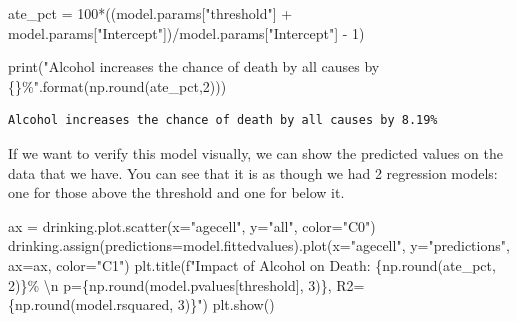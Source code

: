 \documentclass[
  letterpaper,
  DIV=11,
  numbers=noendperiod]{scrreprt}
\newenvironment{Shaded}{\begin{snugshade}}{\end{snugshade}}
\newcommand{\BuiltInTok}[1]{\textcolor[rgb]{0.00,0.23,0.31}{#1}}
\newcommand{\CharTok}[1]{\textcolor[rgb]{0.13,0.47,0.30}{#1}}
\newcommand{\DecValTok}[1]{\textcolor[rgb]{0.68,0.00,0.00}{#1}}
\newcommand{\NormalTok}[1]{\textcolor[rgb]{0.00,0.23,0.31}{#1}}
\newcommand{\OperatorTok}[1]{\textcolor[rgb]{0.37,0.37,0.37}{#1}}
\newcommand{\SpecialCharTok}[1]{\textcolor[rgb]{0.37,0.37,0.37}{#1}}
\newcommand{\SpecialStringTok}[1]{\textcolor[rgb]{0.13,0.47,0.30}{#1}}
\newcommand{\StringTok}[1]{\textcolor[rgb]{0.13,0.47,0.30}{#1}}
\begin{document}
\begin{Shaded}
\begin{Highlighting}[]
\NormalTok{ate\_pct }\OperatorTok{=} \DecValTok{100}\OperatorTok{*}\NormalTok{((model.params[}\StringTok{"threshold"}\NormalTok{] }\OperatorTok{+}\NormalTok{ model.params[}\StringTok{"Intercept"}\NormalTok{])}\OperatorTok{/}\NormalTok{model.params[}\StringTok{"Intercept"}\NormalTok{] }\OperatorTok{{-}} \DecValTok{1}\NormalTok{)}

\BuiltInTok{print}\NormalTok{(}\StringTok{"Alcohol increases the chance of death by all causes by }\SpecialCharTok{\{\}}\StringTok{\%"}\NormalTok{.}\BuiltInTok{format}\NormalTok{(np.}\BuiltInTok{round}\NormalTok{(ate\_pct,}\DecValTok{2}\NormalTok{)))}
\end{Highlighting}
\end{Shaded}

\begin{verbatim}
Alcohol increases the chance of death by all causes by 8.19%
\end{verbatim}

If we want to verify this model visually, we can show the predicted
values on the data that we have. You can see that it is as though we had
2 regression models: one for those above the threshold and one for below
it.

\begin{Shaded}
\begin{Highlighting}[]
\NormalTok{ax }\OperatorTok{=}\NormalTok{ drinking.plot.scatter(x}\OperatorTok{=}\StringTok{"agecell"}\NormalTok{, y}\OperatorTok{=}\StringTok{"all"}\NormalTok{, color}\OperatorTok{=}\StringTok{"C0"}\NormalTok{)}
\NormalTok{drinking.assign(predictions}\OperatorTok{=}\NormalTok{model.fittedvalues).plot(x}\OperatorTok{=}\StringTok{"agecell"}\NormalTok{, y}\OperatorTok{=}\StringTok{"predictions"}\NormalTok{, ax}\OperatorTok{=}\NormalTok{ax, color}\OperatorTok{=}\StringTok{"C1"}\NormalTok{)}
\NormalTok{plt.title(}\SpecialStringTok{f"Impact of Alcohol on Death: }\SpecialCharTok{\{}\NormalTok{np}\SpecialCharTok{.}\BuiltInTok{round}\NormalTok{(ate\_pct, }\DecValTok{2}\NormalTok{)}\SpecialCharTok{\}}\SpecialStringTok{\% }\CharTok{\textbackslash{}n}\SpecialStringTok{ p=}\SpecialCharTok{\{}\NormalTok{np}\SpecialCharTok{.}\BuiltInTok{round}\NormalTok{(model.pvalues[}\StringTok{\textquotesingle{}threshold\textquotesingle{}}\NormalTok{], }\DecValTok{3}\NormalTok{)}\SpecialCharTok{\}}\SpecialStringTok{, R2=}\SpecialCharTok{\{}\NormalTok{np}\SpecialCharTok{.}\BuiltInTok{round}\NormalTok{(model.rsquared, }\DecValTok{3}\NormalTok{)}\SpecialCharTok{\}}\SpecialStringTok{"}\NormalTok{)}
\NormalTok{plt.show()}
\end{Highlighting}
\end{Shaded}
\end{document}
